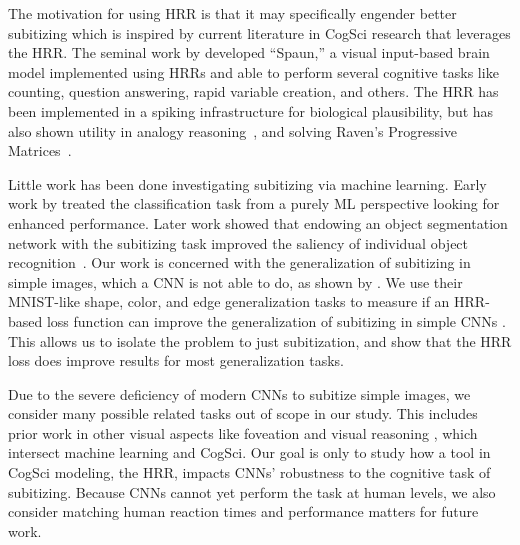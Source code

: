 \documentclass[letterpaper]{article} %
\begin{document}
\par 
The motivation for using HRR is that it may specifically engender better subitizing which is inspired by current literature in CogSci research that leverages the HRR. The seminal work by \cite{Eliasmith2012} developed ``Spaun,''\cite{Choo2018} a visual input-based brain model implemented using HRRs and able to perform several cognitive tasks like counting, 
question answering, rapid variable creation, and others. The HRR has been implemented in a spiking infrastructure \cite{10.3389/fninf.2013.00048} for biological plausibility, but has also shown utility in analogy reasoning~\cite{Eliasmith2001IntegratingSA}, and solving Raven’s Progressive Matrices~\cite{10.1111/j.1756-8765.2010.01127.x}.
\par 
Little work has been done investigating subitizing via machine learning. Early work by \cite{Zhang2015c} treated the classification task from a purely ML perspective looking for enhanced performance. Later work showed that endowing an object segmentation network with the subitizing task improved the saliency of individual object recognition~\cite{He2017, Islam2018}. Our work is concerned with the generalization of subitizing in simple images, which a CNN is not able to do, as shown by \cite{b1}. We use their MNIST-like shape, color, and edge generalization tasks to measure if an HRR-based loss function can improve the generalization of subitizing in simple CNNs \cite{b1}. This allows us to isolate the problem to just subitization, and show that the HRR loss does improve results for most generalization tasks.
\par
Due to the severe deficiency of modern CNNs to subitize simple images, we consider many possible related tasks out of scope in our study. This includes prior work in other visual aspects like foveation \cite{10.1145/3355089.3356557} and visual reasoning \cite{10.5555/3495724.3497106}, which intersect machine learning and CogSci. Our goal is only to study how a tool in CogSci modeling, the HRR, impacts CNNs' robustness to the cognitive task of subitizing. Because CNNs cannot yet perform the task at human levels, we also consider matching human reaction times and performance matters for future work.
\end{document}

